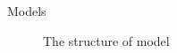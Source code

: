 \documentclass[final]{beamer}
\newlength{\sepwidth}
\newlength{\colwidth}
\newcommand{\separatorcolumn}{\begin{column}{\sepwidth}\end{column}}
\begin{document}
\begin{frame}[t]
\begin{columns}[t]
\begin{column}{\colwidth}
\begin{block}{Models}
\begin{figure}[htbp]
    \caption{The structure of model}
    \label{fig:model}
\end{figure}

  \end{block}


\end{column}

\separatorcolumn

\begin{column}{\colwidth}


\end{column}
\end{columns}
\end{frame}
\end{document}
